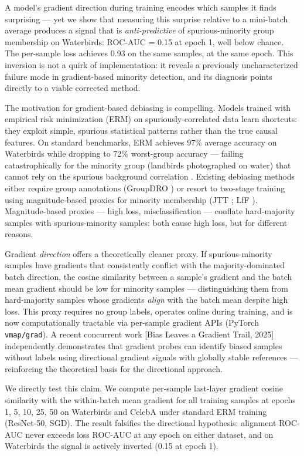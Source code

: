 
A model's gradient direction during training encodes which samples it finds surprising --- yet we show that measuring this surprise relative to a mini-batch average produces a signal that is \textit{anti-predictive} of spurious-minority group membership on Waterbirds: ROC-AUC = 0.15 at epoch 1, well below chance. The per-sample loss achieves 0.93 on the same samples, at the same epoch. This inversion is not a quirk of implementation: it reveals a previously uncharacterized failure mode in gradient-based minority detection, and its diagnosis points directly to a viable corrected method.

The motivation for gradient-based debiasing is compelling. Models trained with empirical risk minimization (ERM) on spuriously-correlated data learn shortcuts: they exploit simple, spurious statistical patterns rather than the true causal features. On standard benchmarks, ERM achieves 97\% average accuracy on Waterbirds while dropping to 72\% worst-group accuracy --- failing catastrophically for the minority group (landbirds photographed on water) that cannot rely on the spurious background correlation \citep{Sagawa2020}. Existing debiasing methods either require group annotations (GroupDRO \citep{Sagawa2020}) or resort to two-stage training using magnitude-based proxies for minority membership (JTT \citep{Liu2021}; LfF \citep{Nam2020}). Magnitude-based proxies --- high loss, misclassification --- conflate hard-majority samples with spurious-minority samples: both cause high loss, but for different reasons.

Gradient \textit{direction} offers a theoretically cleaner proxy. If spurious-minority samples have gradients that consistently conflict with the majority-dominated batch direction, the cosine similarity between a sample's gradient and the batch mean gradient should be low for minority samples --- distinguishing them from hard-majority samples whose gradients \textit{align} with the batch mean despite high loss. This proxy requires no group labels, operates online during training, and is now computationally tractable via per-sample gradient APIs (PyTorch \texttt{vmap/grad}). A recent concurrent work [Bias Leaves a Gradient Trail, 2025] independently demonstrates that gradient probes can identify biased samples without labels using directional gradient signals with globally stable references --- reinforcing the theoretical basis for the directional approach.

We directly test this claim. We compute per-sample last-layer gradient cosine similarity with the within-batch mean gradient for all training samples at epochs {1, 5, 10, 25, 50} on Waterbirds and CelebA under standard ERM training (ResNet-50, SGD). The result falsifies the directional hypothesis: alignment ROC-AUC never exceeds loss ROC-AUC at any epoch on either dataset, and on Waterbirds the signal is actively inverted (0.15 at epoch 1).

